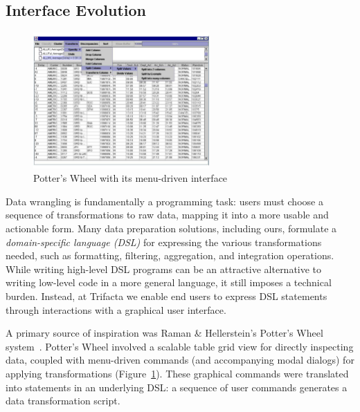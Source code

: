 \documentclass[11pt]{article}
\begin{document}
\subsection{Interface Evolution}
\begin{figure}
        \includegraphics[width=0.6\textwidth]{figs/pwheel.pdf}
        \caption{Potter's Wheel with its menu-driven interface}
        \label{fig:pwheel}
\end{figure}
Data wrangling is fundamentally a programming task: users must choose a sequence of transformations to raw data, mapping it into a more usable and actionable form. Many data preparation solutions, including ours, formulate a \emph{domain-specific language (DSL)} for expressing the various transformations needed, such as formatting, filtering, aggregation, and integration operations. While writing high-level DSL programs can be an attractive alternative to writing low-level code in a more general language, it still imposes a technical burden. Instead, at Trifacta we enable end users to express DSL statements through interactions with a graphical user interface.

A primary source of inspiration was Raman \& Hellerstein's Potter's Wheel system~\cite{raman2001potter}. Potter's Wheel involved a scalable table grid view for directly inspecting data, coupled with menu-driven commands (and accompanying modal dialogs) for applying transformations (Figure~\ref{fig:pwheel}). These graphical commands were translated into statements in an underlying DSL: a sequence of user commands generates a data transformation script.
\end{document}
